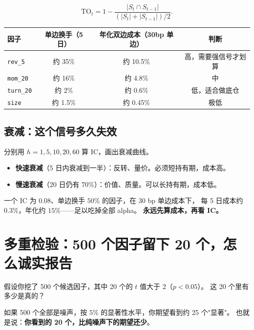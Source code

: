 \begin{equation}
  \mathrm{TO}_t = 1 - \frac{|S_t \cap S_{t-1}|}{(|S_t| + |S_{t-1}|)/2}.
\end{equation}

\begin{center}
\begin{tabular}{@{}lccc@{}}
\toprule
因子 & 单边换手（5 日） & 年化双边成本（30bp 单边） & 判断 \\
\midrule
\texttt{rev\_5} & 约 35\% & 约 10.5\% & 高，需要强信号才划算 \\
\texttt{mom\_20} & 约 16\% & 约 4.8\% & 中 \\
\texttt{turn\_20} & 约 2\% & 约 0.6\% & 低，适合做底仓 \\
\texttt{size} & 约 1.5\% & 约 0.45\% & 极低 \\
\bottomrule
\end{tabular}
\end{center}

\subsection{衰减：这个信号多久失效}

分别用 $h=1,5,10,20,60$ 算 IC，画出衰减曲线。

\begin{itemize}
  \item \textbf{快速衰减}（5 日内衰减到一半）：反转、量价。必须短持有期，成本高。
  \item \textbf{慢速衰减}（20 日仍有 70\%）：价值、质量。可以长持有期，成本低。
\end{itemize}

\begin{warnbox}[高 IC 加高换手等于陷阱]
一个 IC 为 $0.08$、单边换手 $50\%$ 的因子，在 $30$ bp 单边成本下，
每 5 日成本约 $0.3\%$，年化约 $15\%$——足以吃掉全部 alpha。
\textbf{永远先算成本，再看 IC。}
\end{warnbox}

\section{多重检验：500 个因子留下 20 个，怎么诚实报告}

假设你挖了 500 个候选因子，其中 20 个的 $t$ 值大于 2（$p<0.05$）。
这 20 个里有多少是真的？

如果 500 个全部是噪声，按 $5\%$ 的显著性水平，你期望看到约 25 个"显著"。
也就是说：\textbf{你看到的 20 个，比纯噪声下的期望还少}。

